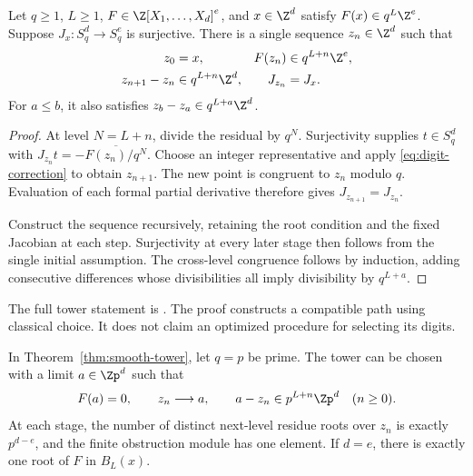 \begin{theorem}\label{thm:smooth-tower}
Let $q\ge1$, $L\ge1$, $F\in\Z[X_1,\ldots,X_d]^e$, and
$x\in\Z^d$ satisfy $F(x)\in q^L\Z^e$. Suppose $J_x:S_q^d\to S_q^e$
is surjective. There is a single sequence $z_n\in\Z^d$ such that
\begin{align*}
 z_0&=x,& F(z_n)&\in q^{L+n}\Z^e,\\
 z_{n+1}-z_n&\in q^{L+n}\Z^d,& J_{z_n}&=J_x.
\end{align*}
For $a\le b$, it also satisfies $z_b-z_a\in q^{L+a}\Z^d$.
\end{theorem}

\begin{proof}
At level $N=L+n$, divide the residual by $q^N$. Surjectivity supplies
$t\in S_q^d$ with $J_{z_n}t=-\overline{F(z_n)/q^N}$. Choose an integer
representative and apply \eqref{eq:digit-correction} to obtain $z_{n+1}$.
The new point is congruent to $z_n$ modulo $q$. Evaluation of each formal
partial derivative therefore gives $J_{z_{n+1}}=J_{z_n}$.

Construct the sequence recursively, retaining the root condition and the
fixed Jacobian at each step. Surjectivity at every later stage then follows
from the single initial assumption. The cross-level congruence follows by
induction, adding consecutive differences whose divisibilities all imply divisibility
by $q^{L+a}$.
\end{proof}

The full tower statement is
.
The proof constructs a compatible path using classical choice. It does not
claim an optimized procedure for selecting its digits.

\begin{theorem}\label{thm:smooth-padic-root}
In Theorem~\ref{thm:smooth-tower}, let $q=p$ be prime. The tower can be
chosen with a limit $a\in\Zp^d$ such that
\[
 F(a)=0,\qquad z_n\longrightarrow a,\qquad
 a-z_n\in p^{L+n}\Zp^d\quad(n\ge0).
\]
At each stage, the number of distinct next-level residue roots over $z_n$
is exactly $p^{d-e}$, and the finite obstruction module has one element.
If $d=e$, there is exactly one root of $F$ in $B_L(x)$.
\end{theorem}

